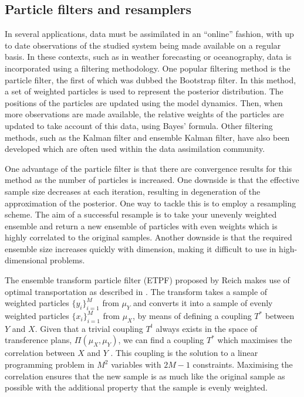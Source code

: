 \documentclass[final]{siamltex}
\begin{document}
\subsection{Particle filters and resamplers}\label{sec:filters}
In several applications, data must be assimilated in an ``online''
fashion, with up to date observations of the studied system being made
available on a regular basis. In these contexts, such as in weather forecasting or
oceanography, data is incorporated using a filtering
methodology. One popular filtering method is the particle filter, the
first of which was dubbed the Bootstrap
filter\cite{gordon1993novel}. In this method, a set of weighted particles is
used to represent the posterior distribution. The positions of the
particles are updated using the model dynamics. Then, when more
observations are made available, the relative weights of the particles
are updated to take account of this data, using Bayes' formula. Other filtering methods, such
as the Kalman filter\cite{kalman1960new} and ensemble Kalman filter\cite{evensen1994sequential}, have also been developed which are often used within the data
assimilation community.

One advantage of the particle filter is that there are convergence
results for this method as the number of particles is increased. One
downside is that the effective sample size decreases at each
iteration, resulting in degeneration of the approximation of the
posterior. One way to tackle
this is to employ a resampling scheme. The aim of a successful
resample is to take your unevenly weighted ensemble and return a new
ensemble of particles with even weights which is highly correlated to
the original samples. Another downside is that the required ensemble
size increases quickly with dimension, making it difficult to use in
high-dimensional problems.

The ensemble transform particle filter (ETPF) proposed by Reich
\cite{reich2013nonparametric} makes use of optimal transportation as
described in \cite{villani2003topics,villani2008optimal}. The transform
takes a sample of weighted particles $\{y_i\}_{i=1}^M$ from $\mu_Y$
and converts it into a sample of evenly weighted particles $\{x_i\}_{i=1}^M$
from $\mu_X$, by means of defining a coupling $T^*$ between $Y$ and
$X$. Given that a trivial coupling $T^t$ always exists in the space of
transference plans, $\Pi(\mu_{X}, \mu_{Y})$, we can find a coupling
$T^*$ which maximises the correlation between $X$ and $Y$
\cite{cotter2012ensemble}. This coupling is the solution to a linear
programming problem in $M^2$ variables with $2M-1$ constraints.
Maximising the correlation ensures that the new sample is as much like
the original sample as possible with the additional property that the sample
is evenly weighted.
\end{document}
